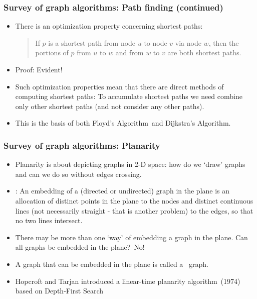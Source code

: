  \begin{frame}[fragile]\frametitle{Survey of graph algorithms: Path finding (continued)}

\begin{itemize}
\item There is an \alert{optimization property} concerning shortest paths:

\begin{quote}
If $p$ is a shortest path from node $u$ to node $v$ via node $w$, then the portions 
of $p$ from $u$ to $w$ and from $w$ to $v$ are both shortest paths.
\end{quote}

\item Proof: Evident!

\item Such optimization properties mean that there are direct methods of computing 
shortest paths: To accumulate shortest paths we need combine only other shortest paths 
(and not consider any other paths).

\item This is the basis of both \color{blue}Floyd's Algorithm\color{black}\ and \color{blue}Dijkstra's Algorithm\color{black}.
\end{itemize}
\end{frame}

  \begin{frame}[fragile]\frametitle{Survey of graph algorithms: Planarity}

\begin{itemize}
\item Planarity is about \color{blue}depicting graphs in 2-D space\color{black}: how do we `draw' graphs and 
can we do so without edges crossing.

\item \color{blue}{\bf Definition}\color{black}: An \alert{embedding} of a (directed or undirected) graph in the plane is an allocation of distinct points in the plane
to the nodes and distinct continuous lines (not necessarily straight - that is another problem) to the edges, so that no two lines intersect.

\item There may be more than one `way' of embedding a graph in the plane. \color{blue}Can all graphs be embedded in the plane?\color{black}\ \alert{No!}

\item A graph that can be embedded in the plane is called a \color{blue}{planar}\color{black}\ graph.

\item  Hopcroft and Tarjan introduced a \color{blue}linear-time planarity algorithm\color{black}\ (1974) based on Depth-First Search
\end{itemize}

\end{frame}


